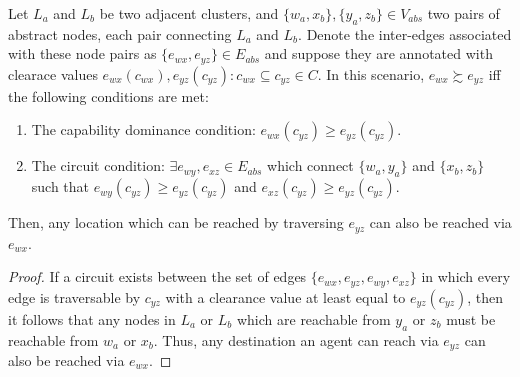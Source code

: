 \begin{theorem}
\label{aha-theorem:weakdominance}
Let $L_{a}$ and $L_{b}$ be two adjacent clusters, and $\lbrace w_{a}, x_{b} \rbrace, \lbrace y_{a}, z_{b} \rbrace \in V_{abs}$ two pairs of abstract nodes, each pair connecting $L_{a}$ and $L_{b}$.
Denote the inter-edges associated with these node pairs as $\lbrace e_{wx}, e_{yz} \rbrace \in E_{abs}$ and suppose they are annotated with clearace values $e_{wx}(c_{wx}), e_{yz}(c_{yz}) : c_{wx} \subseteq c_{yz} \in C$.
 In this scenario, $e_{wx} \succsim e_{yz}$ iff the following conditions are met:
\begin{enumerate}
\item{The capability dominance condition: $e_{wx}(c_{yz}) \geq e_{yz}(c_{yz})$}.
\item{The circuit condition: $\exists e_{wy}, e_{xz} \in E_{abs}$ which connect $\lbrace w_{a}, y_{a} \rbrace$ and $\lbrace x_{b}, z_{b} \rbrace$ such that $e_{wy}(c_{yz}) \geq e_{yz}(c_{yz})$ and $e_{xz}(c_{yz}) \geq e_{yz}(c_{yz})$.}
\end{enumerate}
Then, any location which can be reached by traversing $e_{yz}$ can also be reached via $e_{wx}$.
\end{theorem}

\begin{proof}
If a circuit exists between the set of edges $\lbrace e_{wx}, e_{yz}, e_{wy}, e_{xz} \rbrace$ in which every edge is traversable by $c_{yz}$ with a clearance value at least equal to $e_{yz}(c_{yz})$, then it follows that any nodes in $L_{a}$ or $L_{b}$ which are reachable from $y_{a}$ or $z_{b}$ must be reachable from $w_{a}$ or $x_{b}$.
Thus, any destination an agent can reach via $e_{yz}$ can also be reached via $e_{wx}$. 
\end{proof}

